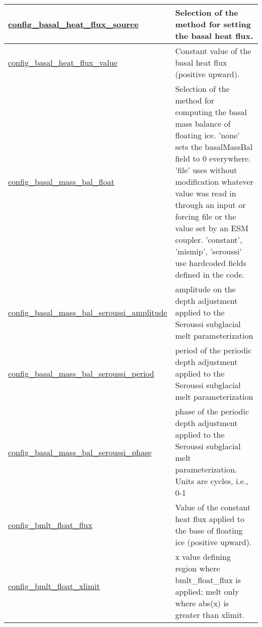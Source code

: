 {\begin{center}
\begin{longtable}{| p{2.0in} || p{4.0in} |}
    \hline
    \hyperref[subsec:nm_sec_config_basal_heat_flux_source]{config\_basal\_heat\_flux\_source} & Selection of the method for setting the basal heat flux. \\
    \hline
    \hyperref[subsec:nm_sec_config_basal_heat_flux_value]{config\_basal\_heat\_flux\_value} & Constant value of the basal heat flux (positive upward). \\
    \hline
    \hyperref[subsec:nm_sec_config_basal_mass_bal_float]{config\_basal\_mass\_bal\_float} & Selection of the method for computing the basal mass balance of floating ice.  'none' sets the basalMassBal field to 0 everywhere.  'file' uses without modification whatever value was read in through an input or forcing file or the value set by an ESM coupler.  'constant', 'mismip', 'seroussi' use hardcoded fields defined in the code. \\
    \hline
    \hyperref[subsec:nm_sec_config_basal_mass_bal_seroussi_amplitude]{config\_basal\_mass\_bal\_\-seroussi\_amplitude} & amplitude on the depth adjustment applied to the Seroussi subglacial melt parameterization \\
    \hline
    \hyperref[subsec:nm_sec_config_basal_mass_bal_seroussi_period]{config\_basal\_mass\_bal\_\-seroussi\_period} & period of the periodic depth adjustment applied to the Seroussi subglacial melt parameterization \\
    \hline
    \hyperref[subsec:nm_sec_config_basal_mass_bal_seroussi_phase]{config\_basal\_mass\_bal\_\-seroussi\_phase} & phase of the periodic depth adjustment applied to the Seroussi subglacial melt parameterization. Units are cycles, i.e., 0-1 \\
    \hline
    \hyperref[subsec:nm_sec_config_bmlt_float_flux]{config\_bmlt\_float\_flux} & Value of the constant heat flux applied to the base of floating ice (positive upward). \\
    \hline
    \hyperref[subsec:nm_sec_config_bmlt_float_xlimit]{config\_bmlt\_float\_xlimit} & x value defining region where bmlt\_float\_flux is applied; melt only where abs(x) is greater than xlimit. \\
    \hline
\end{longtable}
\end{center}
}
